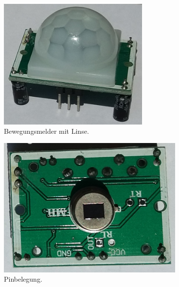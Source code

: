 \begin{minipage}{0.3\textwidth}
	\begin{figure}[H]
		\centering
		\includegraphics[width=0.67\textwidth]{pics/bewegungsmelder.jpg}
		\caption{Bewegungsmelder mit Linse.}
		\label{abb:bewegungsmelder}
	\end{figure}
\end{minipage}
\hfill
\begin{minipage}{0.3\textwidth}
	\begin{figure}[H]
		\centering
		\includegraphics[width=0.83\textwidth]{pics/bewegungsmelder-ohne-linse.jpg}
		\caption{Pinbelegung.}
		\label{abb:bewegungsmelder-ohne-linse}
	\end{figure}
\end{minipage}
\hfill

